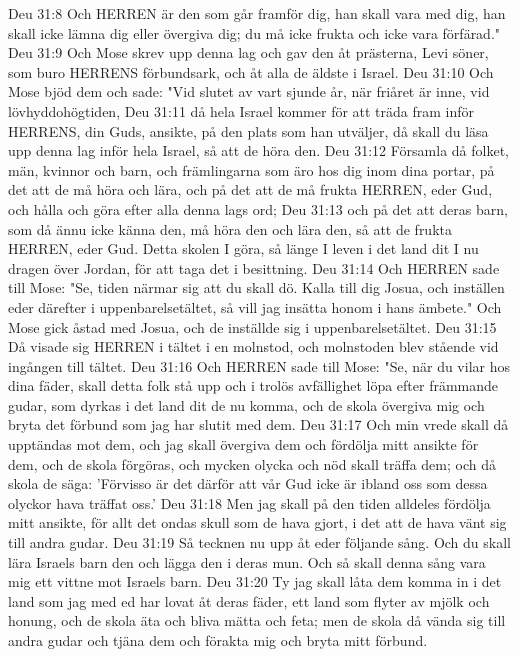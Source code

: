Deu 31:8  Och HERREN är den som går framför dig, han skall vara med dig, han skall icke lämna dig eller övergiva dig; du må icke frukta och icke vara förfärad."
Deu 31:9  Och Mose skrev upp denna lag och gav den åt prästerna, Levi söner, som buro HERRENS förbundsark, och åt alla de äldste i Israel.
Deu 31:10  Och Mose bjöd dem och sade: "Vid slutet av vart sjunde år, när friåret är inne, vid lövhyddohögtiden,
Deu 31:11  då hela Israel kommer för att träda fram inför HERRENS, din Guds, ansikte, på den plats som han utväljer, då skall du läsa upp denna lag inför hela Israel, så att de höra den.
Deu 31:12  Församla då folket, män, kvinnor och barn, och främlingarna som äro hos dig inom dina portar, på det att de må höra och lära, och på det att de må frukta HERREN, eder Gud, och hålla och göra efter alla denna lags ord;
Deu 31:13  och på det att deras barn, som då ännu icke känna den, må höra den och lära den, så att de frukta HERREN, eder Gud. Detta skolen I göra, så länge I leven i det land dit I nu dragen över Jordan, för att taga det i besittning.
Deu 31:14  Och HERREN sade till Mose: "Se, tiden närmar sig att du skall dö. Kalla till dig Josua, och inställen eder därefter i uppenbarelsetältet, så vill jag insätta honom i hans ämbete." Och Mose gick åstad med Josua, och de inställde sig i uppenbarelsetältet.
Deu 31:15  Då visade sig HERREN i tältet i en molnstod, och molnstoden blev stående vid ingången till tältet.
Deu 31:16  Och HERREN sade till Mose: "Se, när du vilar hos dina fäder, skall detta folk stå upp och i trolös avfällighet löpa efter främmande gudar, som dyrkas i det land dit de nu komma, och de skola övergiva mig och bryta det förbund som jag har slutit med dem.
Deu 31:17  Och min vrede skall då upptändas mot dem, och jag skall övergiva dem och fördölja mitt ansikte för dem, och de skola förgöras, och mycken olycka och nöd skall träffa dem; och då skola de säga: 'Förvisso är det därför att vår Gud icke är ibland oss som dessa olyckor hava träffat oss.'
Deu 31:18  Men jag skall på den tiden alldeles fördölja mitt ansikte, för allt det ondas skull som de hava gjort, i det att de hava vänt sig till andra gudar.
Deu 31:19  Så tecknen nu upp åt eder följande sång. Och du skall lära Israels barn den och lägga den i deras mun. Och så skall denna sång vara mig ett vittne mot Israels barn.
Deu 31:20  Ty jag skall låta dem komma in i det land som jag med ed har lovat åt deras fäder, ett land som flyter av mjölk och honung, och de skola äta och bliva mätta och feta; men de skola då vända sig till andra gudar och tjäna dem och förakta mig och bryta mitt förbund.
